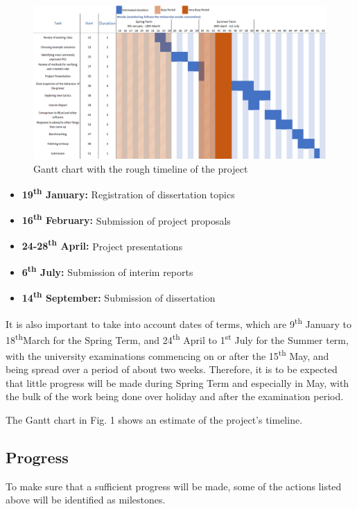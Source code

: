 \documentclass[11pt,journal]{IEEEtran}
\begin{document}
	\begin{figure}[]
		\includegraphics[width=\textwidth]{gantt_chart.png}
		\caption{Gantt chart with the rough timeline of the project}
	\end{figure}
	\begin{itemize}
		\item \textbf{19\textsuperscript{th} January:} Registration of dissertation topics
		\item \textbf{16\textsuperscript{th} February:} Submission of project proposals
		\item \textbf{24-28\textsuperscript{th} April:} Project presentations
		\item \textbf{6\textsuperscript{th} July:} Submission of interim reports
		\item \textbf{14\textsuperscript{th} September:} Submission of dissertation
	\end{itemize}
	

	It is also important to take into account dates of terms, which are 9\textsuperscript{th} January to 18\textsuperscript{th}March for the Spring Term, and 24\textsuperscript{th} April to 1\textsuperscript{st} July for the Summer term, with the university examinations commencing on or after the 15\textsuperscript{th} May, and being spread over a period of about two weeks. Therefore, it is to be expected that little progress will be made during Spring Term and especially in May, with the bulk of the work being done over holiday and after the examination period.
	
	The Gantt chart in Fig. 1 shows an estimate of the project's timeline. 	


		
	\subsection{Progress}
	To make sure that a sufficient progress will be made, some of the actions listed above will be identified as milestones. 
	
\end{document}
